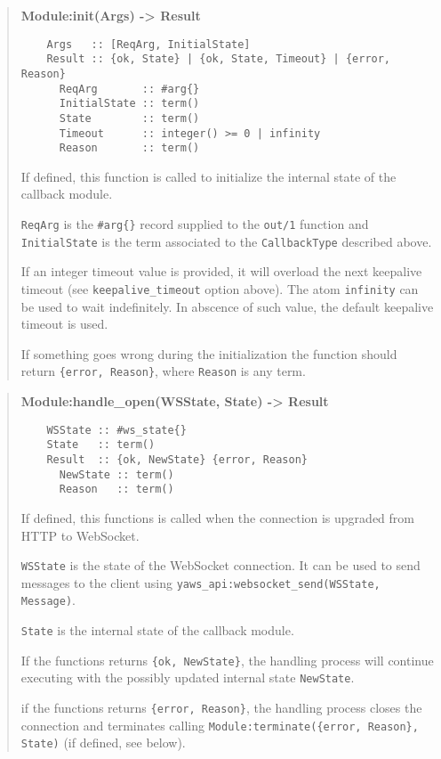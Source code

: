 \documentclass[11pt,oneside,english]{book}
\begin{document}
\begin{quote}
  \textbf{Module:init(Args) -> Result}
\begin{verbatim}
    Args   :: [ReqArg, InitialState]
    Result :: {ok, State} | {ok, State, Timeout} | {error, Reason}
      ReqArg       :: #arg{}
      InitialState :: term()
      State        :: term()
      Timeout      :: integer() >= 0 | infinity
      Reason       :: term()
\end{verbatim}

  If defined, this function is called to initialize the internal state of the
  callback module.

  \verb+ReqArg+ is the \verb+#arg{}+ record supplied to the \verb+out/1+
  function and \verb+InitialState+ is the term associated to the
  \verb+CallbackType+ described above.

  If an integer timeout value is provided, it will overload the next keepalive
  timeout (see \verb+keepalive_timeout+ option above). The atom \verb+infinity+
  can be used to wait indefinitely. In abscence of such value, the default
  keepalive timeout is used.

  If something goes wrong during the initialization the function should return
  \verb+{error, Reason}+, where \verb+Reason+ is any term.
\end{quote}


\begin{quote}
  \textbf{Module:handle\_open(WSState, State) -> Result}
\begin{verbatim}
    WSState :: #ws_state{}
    State   :: term()
    Result  :: {ok, NewState} {error, Reason}
      NewState :: term()
      Reason   :: term()
\end{verbatim}

  If defined, this functions is called when the connection is upgraded from HTTP
  to WebSocket.

  \verb+WSState+ is the state of the WebSocket connection. It can be used to
  send messages to the client using
  \verb+yaws_api:websocket_send(WSState, Message)+.

  \verb+State+ is the internal state of the callback module.

  If the functions returns \verb+{ok, NewState}+, the handling process will
  continue executing with the possibly updated internal state \verb+NewState+.

  if the functions returns \verb+{error, Reason}+, the handling process closes
  the connection and terminates calling
  \verb+Module:terminate({error, Reason}, State)+ (if defined, see below).
\end{quote}
\end{document}
